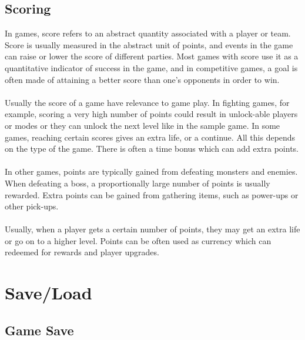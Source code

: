 \documentclass[11pt,fleqn]{book} %
\begin{document}
\section{Scoring}
In games, score refers to an abstract quantity associated with a player or team. Score is usually measured in the abstract unit of points, and events in the game can raise or lower the score of different parties. Most games with score use it as a quantitative indicator of success in the game, and in competitive games, a goal is often made of attaining a better score than one's opponents in order to win. \\
\\
Usually the score of a game have relevance to game play. In fighting games, for example, scoring a very high number of points could result in unlock-able players or modes or they can unlock the next level like in the sample game. In some games, reaching certain scores gives an extra life, or a continue. All this depends on the type of the game. There is often a time bonus which can add extra points.   \\
\\
In other games, points are typically gained from defeating monsters and enemies. When defeating a boss, a proportionally large number of points is usually rewarded. Extra points can be gained from gathering items, such as power-ups or other pick-ups. \\ 
\\
Usually, when a player gets a certain number of points, they may get an extra life or go on to a higher level. Points can be often used as currency which can redeemed for rewards and player upgrades.
\chapter{Save/Load} %
    \section{Game Save}
\end{document}
